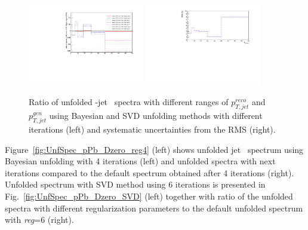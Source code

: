 \begin{figure}[bth]
\centering
\includegraphics[width=0.45\textwidth]{pPbcuts_2sig/unfolding/UnfoldingRangesComparison_ratio}
\includegraphics[width=0.45\textwidth]{pPbcuts_2sig/unfolding/UnfoldingRangesComparison_rms}
\caption{Ratio of unfolded \Dzero-jet \pt\ spectra with different ranges of $p_{T,jet}^{reco}$ and $p_{T,jet}^{gen}$ using Bayesian and SVD unfolding methods with different iterations (left) and systematic uncertainties from the RMS (right).}
\label{fig:UnfSpec_pPb_Dzero_ranges}
\end{figure}



Figure~\ref{fig:UnfSpec_pPb_Dzero_reg4} (left) shows unfolded jet \pt\ spectrum using Bayesian unfolding with 4 iterations (left) and unfolded spectra with next iterations compared to the default spectrum obtained after 4 iterations (right).
Unfolded spectrum with SVD method using 6 iterations is presented in Fig.~\ref{fig:UnfSpec_pPb_Dzero_SVD} (left) together with ratio of the unfolded spectra with different regularization parameters to the default unfolded spectrum with {\it reg}=6 (right).

